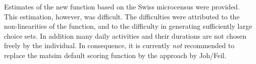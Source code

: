 Estimates of the new function based on the Swiss microcensus were provided. 
This estimation, however, was difficult.  The difficulties were attributed to the non-linearities of the function, and to the difficulty in generating sufficiently large choice sets. 
In addition many daily activities and their durations are not chosen freely by the individual. 
In consequence, it is currently \emph{not} recommended to replace the \gls{matsim} default scoring function by the approach by Joh/Feil.




